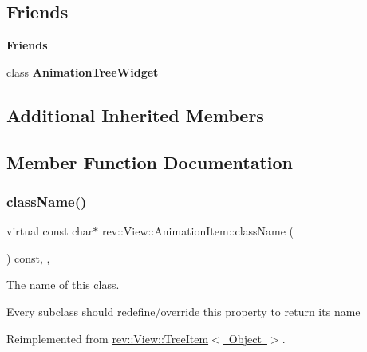 \subsection*{Friends}
\begin{Indent}\textbf{ Friends}\par
\begin{DoxyCompactItemize}
\item 
\mbox{\label{classrev_1_1_view_1_1_animation_item_a7ae3043e1d76d73e5f7e71df51bb5768}} 
class {\bfseries Animation\+Tree\+Widget}
\end{DoxyCompactItemize}
\end{Indent}
\subsection*{Additional Inherited Members}


\subsection{Member Function Documentation}
\mbox{\label{classrev_1_1_view_1_1_animation_item_aa842daa5b936f8b12980b49505cba185}} 
\subsubsection{\texorpdfstring{className()}{className()}}
{\footnotesize\ttfamily virtual const char$\ast$ rev\+::\+View\+::\+Animation\+Item\+::class\+Name (\begin{DoxyParamCaption}{ }\end{DoxyParamCaption}) const\hspace{0.3cm}{\ttfamily [inline]}, {\ttfamily [override]}, {\ttfamily [virtual]}}



The name of this class. 

Every subclass should redefine/override this property to return its name 

Reimplemented from \mbox{\hyperlink{classrev_1_1_view_1_1_tree_item_a8a12a6ceece6cab7a2299da2b5e6a54b}{rev\+::\+View\+::\+Tree\+Item$<$ Object $>$}}.

\mbox{\label{classrev_1_1_view_1_1_animation_item_a249007fb87aec92b8fc569d3bde45793}} 
